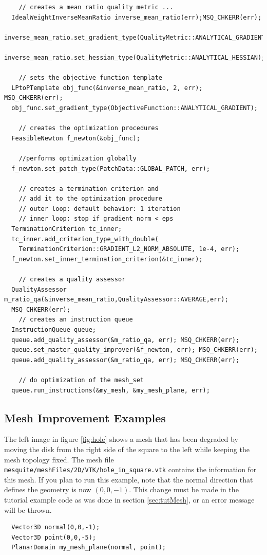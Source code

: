 \begin{verbatim}
    // creates a mean ratio quality metric ...
  IdealWeightInverseMeanRatio inverse_mean_ratio(err);MSQ_CHKERR(err);
  inverse_mean_ratio.set_gradient_type(QualityMetric::ANALYTICAL_GRADIENT);
  inverse_mean_ratio.set_hessian_type(QualityMetric::ANALYTICAL_HESSIAN);

    // sets the objective function template
  LPtoPTemplate obj_func(&inverse_mean_ratio, 2, err); MSQ_CHKERR(err);
  obj_func.set_gradient_type(ObjectiveFunction::ANALYTICAL_GRADIENT);
  
    // creates the optimization procedures
  FeasibleNewton f_newton(&obj_func);

    //performs optimization globally
  f_newton.set_patch_type(PatchData::GLOBAL_PATCH, err); 

    // creates a termination criterion and 
    // add it to the optimization procedure
    // outer loop: default behavior: 1 iteration
    // inner loop: stop if gradient norm < eps
  TerminationCriterion tc_inner;
  tc_inner.add_criterion_type_with_double(
    TerminationCriterion::GRADIENT_L2_NORM_ABSOLUTE, 1e-4, err); 
  f_newton.set_inner_termination_criterion(&tc_inner);

    // creates a quality assessor
  QualityAssessor m_ratio_qa(&inverse_mean_ratio,QualityAssessor::AVERAGE,err);
  MSQ_CHKERR(err);
    // creates an instruction queue
  InstructionQueue queue;
  queue.add_quality_assessor(&m_ratio_qa, err); MSQ_CHKERR(err);
  queue.set_master_quality_improver(&f_newton, err); MSQ_CHKERR(err);
  queue.add_quality_assessor(&m_ratio_qa, err); MSQ_CHKERR(err);

    // do optimization of the mesh_set
  queue.run_instructions(&my_mesh, &my_mesh_plane, err); 
\end{verbatim} 

\subsection{Mesh Improvement Examples}

The left image in figure \ref{fig:hole} shows a mesh that has
been degraded by moving the disk from the right side of the square to
the left while keeping the mesh topology fixed.
The mesh file
\texttt{mesquite/meshFiles/2D/VTK/hole\_in\_square.vtk} contains the
information for this mesh.  If you plan to run this example, note that
the normal direction that defines the geometry is now $(0,0,-1)$.
This change must be made in the tutorial example code
as was done in section \ref{sec:tutMesh}, or an error message will be
thrown.
\begin{verbatim}
  Vector3D normal(0,0,-1);
  Vector3D point(0,0,-5);
  PlanarDomain my_mesh_plane(normal, point);
\end{verbatim}


